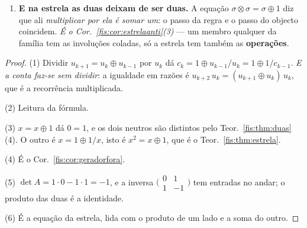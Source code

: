 \documentclass[livro.tex]{subfiles}
\begin{document}
\begin{teorema}
\begin{enumerate}
escreve-se $A=\bigl(\begin{smallmatrix}1&1\\1&0\end{smallmatrix}\bigr)$, com
$\det A=-1$; logo a inversa é \textbf{inteira} e a descida é exacta.
\[
\boxed{\;\abs{\det A}=1\ \Longrightarrow\ \text{subir e descer são o \emph{mesmo} caminho}\;}
\]
\emph{É este, e não outro, o sentido em que a estrela é \textbf{interface
reversível}}: nada se perde ao subir, porque a descida existe e não aproxima ---
devolve.
\item[(6)] \textbf{E na estrela as duas deixam de ser duas.} A equação
$\sigma\otimes\sigma=\sigma\oplus1$ diz que ali \emph{multiplicar por ela é somar
um}: o passo da regra e o passo do objecto coincidem. \emph{É o
Cor.~\ref{fis:cor:estrelaanti}(3)} --- um membro qualquer da família tem as
involuções coladas, só a estrela tem também as \textbf{operações}.
\end{enumerate}
\end{teorema}

\begin{proof}
(1) Dividir $u_{k+1}=u_k\oplus u_{k-1}$ por $u_k$ dá
$c_k=1\oplus u_{k-1}/u_k=1\oplus1/c_{k-1}$. \emph{E a conta faz-se sem dividir}:
a igualdade em razões é $u_{k+2}\,u_k=(u_{k+1}\oplus u_k)\,u_k$, que é a
recorrência multiplicada.

(2) Leitura da fórmula.

(3) $x=x\oplus1$ dá $0=1$, e os dois neutros são distintos pelo
Teor.~\ref{fis:thm:duas}(4). O outro é $x=1\oplus1/x$, isto é $x^{2}=x\oplus1$,
que é o Teor.~\ref{fis:thm:estrela}.

(4) É o Cor.~\ref{fis:cor:geradorfora}.

(5) $\det A=1\cdot0-1\cdot1=-1$, e a inversa
$\bigl(\begin{smallmatrix}0&1\\1&-1\end{smallmatrix}\bigr)$ tem entradas no
andar; o produto das duas é a identidade.

(6) É a equação da estrela, lida com o produto de um lado e a soma do outro.
\end{proof}

\end{document}
